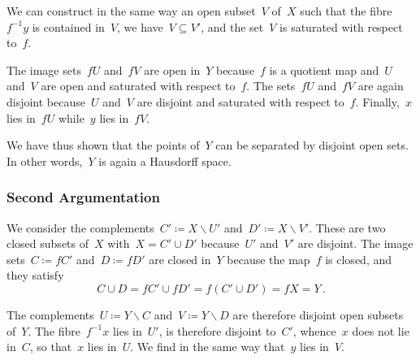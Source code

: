 We can construct in the same way an open subset~$V$ of~$X$ such that the fibre~$f^{-1} y$ is contained in~$V$, we have~$V ⊆ V'$, and the set~$V$ is saturated with respect to~$f$.

The image sets~$f U$ and~$f V$ are open in~$Y$ because~$f$ is a quotient map and~$U$ and~$V$ are open and saturated with respect to~$f$.
The sets~$f U$ and~$f V$ are again disjoint because~$U$ and~$V$ are disjoint and saturated with respect to~$f$.
Finally,~$x$ lies in~$f U$ while~$y$ lies in~$f V$.

We have thus shown that the points of~$Y$ can be separated by disjoint open sets.
In other words,~$Y$ is again a Hausdorff space.

\subsubsection{Second Argumentation}

We consider the complements~$C' ≔ X ∖ U'$ and~$D' ≔ X ∖ V'$.
These are two closed subsets of~$X$ with~$X = C' ∪ D'$ because~$U'$ and~$V'$ are disjoint.
The image sets~$C ≔ f C'$ and~$D ≔ f D'$ are closed in~$Y$ because the map~$f$ is closed, and they satisfy
\[
	C ∪ D = f C' ∪ f D' = f (C' ∪ D') = f X = Y \,.
\]

The complements~$U ≔ Y ∖ C$ and~$V ≔ Y ∖ D$ are therefore disjoint open subsets of~$Y$.
The fibre~$f^{-1} x$ lies in~$U'$, is therefore disjoint to~$C'$, whence~$x$ does not lie in~$C$, so that~$x$ lies in~$U$.
We find in the same way that~$y$ lies in~$V$.
